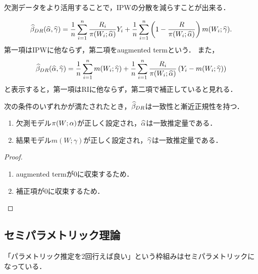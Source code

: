 \documentclass[uplatex,dvipdfmx]{jsreport}
\begin{document}
欠測データをより活用することで，IPWの分散を減らすことが出来る．

\[\widehat{\beta}_{DR}(\widehat{\alpha},\widehat{\gamma})=\frac{1}{n}\sum^n_{i=1}\frac{R_i}{\pi(W_i;\widehat{\alpha})}Y_i+\frac{1}{n}\sum^n_{i=1}\left(1-\frac{R}{\pi(W_i;\widehat{\alpha})}\right)m(W_i;\widehat{\gamma}).\]
第一項はIPWに他ならず，第二項をaugmented termという．
また，
\[\widehat{\beta}_{DR}(\widehat{\alpha},\widehat{\gamma})=\frac{1}{n}\sum^n_{i=1}m(W_i;\widehat{\gamma})+\frac{1}{n}\sum^n_{i=1}\frac{R_i}{\pi(W_i;\widehat{\alpha})}\left(Y_i-m(W_i;\widehat{\gamma})\right)\]
と表示すると，第一項はRIに他ならず，第二項で補正していると見れる．

\begin{theorem}[2重ロバスト性]
    次の条件のいずれかが満たされたとき，$\widehat{\beta}_{DR}$は一致性と漸近正規性を持つ．
    \begin{enumerate}
        \item 欠測モデル$\pi(W;\alpha)$が正しく設定され，$\widehat{\alpha}$は一致推定量である．
        \item 結果モデル$m(W;\gamma)$が正しく設定され，$\widehat{\gamma}$は一致推定量である．
    \end{enumerate}
\end{theorem}
\begin{proof}\mbox{}
    \begin{enumerate}
        \item augmented termが$0$に収束するため．
        \item 補正項が$0$に収束するため．
    \end{enumerate}
\end{proof}

\subsection{セミパラメトリック理論}

\begin{tcolorbox}[colframe=ForestGreen, colback=ForestGreen!10!white,breakable,colbacktitle=ForestGreen!40!white,coltitle=black,fonttitle=\bfseries\sffamily,
title=]
    「パラメトリック推定を2回行えば良い」という枠組みはセミパラメトリックになっている．
\end{tcolorbox}
\end{document}
